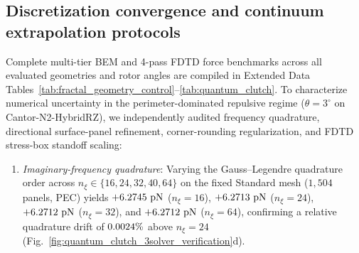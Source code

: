 \documentclass[pdflatex,sn-nature]{sn-jnl}
\DeclareRobustCommand{\roundfour}[1]{\fpeval{round(#1,4)}}
\begin{document}
\subsection*{Discretization convergence and continuum extrapolation protocols}
Complete multi-tier BEM and 4-pass FDTD force benchmarks across all evaluated geometries and rotor angles are compiled in Extended Data Tables~\ref{tab:fractal_geometry_control}--\ref{tab:quantum_clutch}. To characterize numerical uncertainty in the perimeter-dominated repulsive regime ($\theta=3^\circ$ on Cantor-N2-HybridRZ), we independently audited frequency quadrature, directional surface-panel refinement, corner-rounding regularization, and FDTD stress-box standoff scaling:
\begin{enumerate}
    \item \emph{Imaginary-frequency quadrature}: Varying the Gauss--Legendre quadrature order across $n_\xi \in \{16, 24, 32, 40, 64\}$ on the fixed Standard mesh ($1{,}504$ panels, PEC) yields $+\roundfour{\BemConvStdNxionesixPecFzPn}\text{ pN}$ ($n_\xi=16$), $+\roundfour{\BemConvStdNxitwofourPecFzPn}\text{ pN}$ ($n_\xi=24$), $+\roundfour{\BemConvStdNxithreetwoPecFzPn}\text{ pN}$ ($n_\xi=32$), and $+\roundfour{\BemConvStdNxisixfourPecFzPn}\text{ pN}$ ($n_\xi=64$), confirming a relative quadrature drift of $\roundfour{\BemConvNxiDriftPct}\%$ above $n_\xi = 24$ (Fig.~\ref{fig:quantum_clutch_3solver_verification}d).

\end{enumerate}
\end{document}
